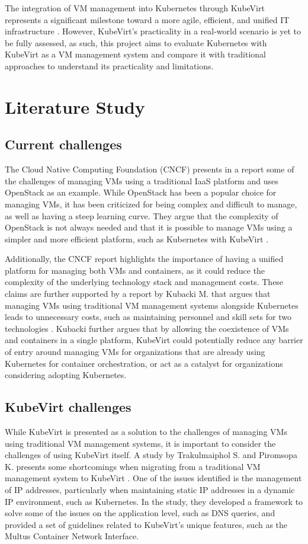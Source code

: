 \documentclass{article}
\begin{document}
The integration of VM management into Kubernetes through KubeVirt represents a significant milestone toward a more agile, efficient, and unified IT infrastructure \cite{kubevirt-storware}. However, KubeVirt's practicality in a real-world scenario is yet to be fully assessed, as such, this project aims to evaluate Kubernetes with KubeVirt as a VM management system and compare it with traditional approaches to understand its practicality and limitations.


\newpage
\section{Literature Study}
\label{literature-study}
\subsection{Current challenges}
The Cloud Native Computing Foundation (CNCF) presents in a report some of the challenges of managing VMs using a traditional IaaS platform and uses OpenStack as an example. While OpenStack has been a popular choice for managing VMs, it has been criticized for being complex and difficult to manage, as well as having a steep learning curve. They argue that the complexity of OpenStack is not always needed and that it is possible to manage VMs using a simpler and more efficient platform, such as Kubernetes with KubeVirt \cite{kubevirt-cncf}. 

Additionally, the CNCF report highlights the importance of having a unified platform for managing both VMs and containers, as it could reduce the complexity of the underlying technology stack and management costs. These claims are further supported by a report by Kubacki M. that argues that managing VMs using traditional VM management systems alongside Kubernetes leads to unnecessary costs, such as maintaining personnel and skill sets for two technologies \cite{kubevirt-storware}. Kubacki further argues that by allowing the coexistence of VMs and containers in a single platform, KubeVirt could potentially reduce any barrier of entry around managing VMs for organizations that are already using Kubernetes for container orchestration, or act as a catalyst for organizations considering adopting Kubernetes. 

\subsection{KubeVirt challenges}
While KubeVirt is presented as a solution to the challenges of managing VMs using traditional VM management systems, it is important to consider the challenges of using KubeVirt itself. A study by Trakulmaiphol S. and Piromsopa K. presents some shortcomings when migrating from a traditional VM management system to KubeVirt \cite{kubevirt-migrate-issues}. One of the issues identified is the management of IP addresses, particularly when maintaining static IP addresses in a dynamic IP environment, such as Kubernetes. In the study, they developed a framework to solve some of the issues on the application level, such as DNS queries, and provided a set of guidelines related to KubeVirt's unique features, such as the Multus Container Network Interface. 
\end{document}
